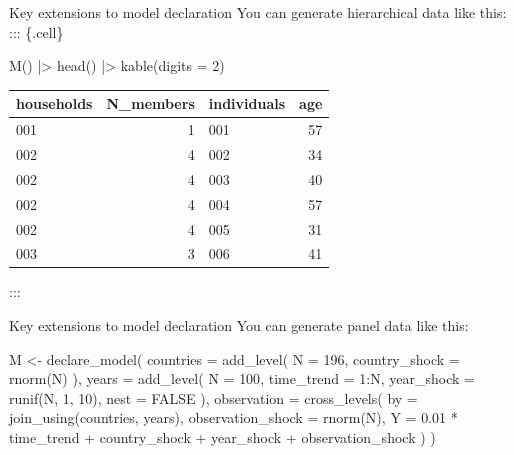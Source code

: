 \documentclass[
  11pt,
  ignorenonframetext,
]{beamer}
\newenvironment{Shaded}{\begin{snugshade}}{\end{snugshade}}
\newcommand{\AttributeTok}[1]{\textcolor[rgb]{0.40,0.45,0.13}{#1}}
\newcommand{\ConstantTok}[1]{\textcolor[rgb]{0.56,0.35,0.01}{#1}}
\newcommand{\DecValTok}[1]{\textcolor[rgb]{0.68,0.00,0.00}{#1}}
\newcommand{\FloatTok}[1]{\textcolor[rgb]{0.68,0.00,0.00}{#1}}
\newcommand{\FunctionTok}[1]{\textcolor[rgb]{0.28,0.35,0.67}{#1}}
\newcommand{\NormalTok}[1]{\textcolor[rgb]{0.00,0.23,0.31}{#1}}
\newcommand{\OtherTok}[1]{\textcolor[rgb]{0.00,0.23,0.31}{#1}}
\newcommand{\SpecialCharTok}[1]{\textcolor[rgb]{0.37,0.37,0.37}{#1}}
\begin{document}
\begin{frame}[fragile]{Key extensions to model declaration}
\protect\hypertarget{key-extensions-to-model-declaration-1}{}
You can generate hierarchical data like this: ::: \{.cell\}

\begin{Shaded}
\begin{Highlighting}[]
\FunctionTok{M}\NormalTok{() }\SpecialCharTok{|\textgreater{}} \FunctionTok{head}\NormalTok{() }\SpecialCharTok{|\textgreater{}} \FunctionTok{kable}\NormalTok{(}\AttributeTok{digits =} \DecValTok{2}\NormalTok{)}
\end{Highlighting}
\end{Shaded}

\begin{tabular}{l|r|l|r}
\hline
households & N\_members & individuals & age\\
\hline
001 & 1 & 001 & 57\\
\hline
002 & 4 & 002 & 34\\
\hline
002 & 4 & 003 & 40\\
\hline
002 & 4 & 004 & 57\\
\hline
002 & 4 & 005 & 31\\
\hline
003 & 3 & 006 & 41\\
\hline
\end{tabular}

:::
\end{frame}

\begin{frame}[fragile]{Key extensions to model declaration}
\protect\hypertarget{key-extensions-to-model-declaration-2}{}
You can generate panel data like this:

\begin{Shaded}
\begin{Highlighting}[]
\NormalTok{M }\OtherTok{\textless{}{-}} 
  \FunctionTok{declare\_model}\NormalTok{(}
    \AttributeTok{countries =} \FunctionTok{add\_level}\NormalTok{(}
      \AttributeTok{N =} \DecValTok{196}\NormalTok{, }
      \AttributeTok{country\_shock =} \FunctionTok{rnorm}\NormalTok{(N)}
\NormalTok{    ),}
    \AttributeTok{years =} \FunctionTok{add\_level}\NormalTok{(}
      \AttributeTok{N =} \DecValTok{100}\NormalTok{, }
      \AttributeTok{time\_trend =} \DecValTok{1}\SpecialCharTok{:}\NormalTok{N,}
      \AttributeTok{year\_shock =} \FunctionTok{runif}\NormalTok{(N, }\DecValTok{1}\NormalTok{, }\DecValTok{10}\NormalTok{), }
      \AttributeTok{nest =} \ConstantTok{FALSE}
\NormalTok{    ),}
    \AttributeTok{observation =} \FunctionTok{cross\_levels}\NormalTok{(}
      \AttributeTok{by =} \FunctionTok{join\_using}\NormalTok{(countries, years),}
      \AttributeTok{observation\_shock =} \FunctionTok{rnorm}\NormalTok{(N),}
      \AttributeTok{Y =} \FloatTok{0.01} \SpecialCharTok{*}\NormalTok{ time\_trend }\SpecialCharTok{+}\NormalTok{ country\_shock }\SpecialCharTok{+}\NormalTok{ year\_shock }\SpecialCharTok{+}\NormalTok{ observation\_shock }
\NormalTok{    )}
\NormalTok{  )}
\end{Highlighting}
\end{Shaded}
\end{frame}
\end{document}
